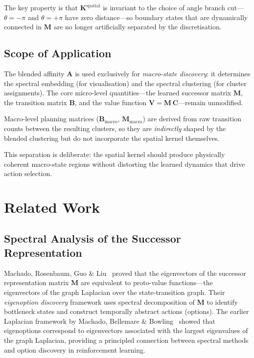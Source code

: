 \documentclass[11pt,a4paper]{article}
\begin{document}
The key property is that $\mathbf{K}^{\text{spatial}}$ is invariant to
the choice of angle branch cut---$\theta = -\pi$ and $\theta = +\pi$
have zero distance---so boundary states that are dynamically connected in
$\mathbf{M}$ are no longer artificially separated by the discretisation.

\subsection{Scope of Application}

The blended affinity $\mathbf{A}$ is used exclusively for \emph{macro-state
discovery}: it determines the spectral embedding (for visualisation) and
the spectral clustering (for cluster assignments).  The core micro-level
quantities---the learned successor matrix $\mathbf{M}$, the transition
matrix $\mathbf{B}$, and the value function
$\mathbf{V} = \mathbf{M}\,\mathbf{C}$---remain unmodified.

Macro-level planning matrices ($\mathbf{B}_{\text{macro}}$,
$\mathbf{M}_{\text{macro}}$) are derived from raw transition counts
between the resulting clusters, so they are \emph{indirectly} shaped by
the blended clustering but do not incorporate the spatial kernel
themselves.

This separation is deliberate: the spatial kernel should produce
physically coherent macro-state regions without distorting the learned
dynamics that drive action selection.

\section{Related Work}

\subsection{Spectral Analysis of the Successor Representation}

Machado, Rosenbaum, Guo \& Liu~\cite{machado2018} proved that the
eigenvectors of the successor representation matrix $\mathbf{M}$ are
equivalent to proto-value functions---the eigenvectors of the graph
Laplacian over the state-transition graph.  Their \emph{eigenoption
discovery} framework uses spectral decomposition of $\mathbf{M}$ to
identify bottleneck states and construct temporally abstract actions
(options).  The earlier Laplacian framework by Machado, Bellemare \&
Bowling~\cite{machado2017} showed that eigenoptions correspond to
eigenvectors associated with the largest eigenvalues of the graph
Laplacian, providing a principled connection between spectral methods and
option discovery in reinforcement learning.
\end{document}
